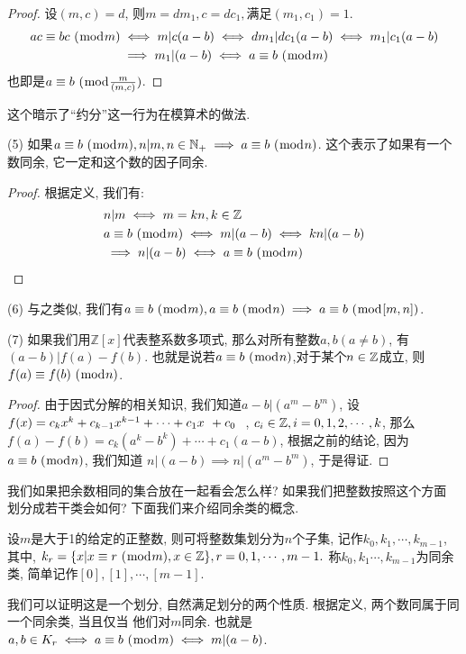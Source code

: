\begin{proof}
    设$(m,c)=d$, 则$m=dm_1, c=dc_1, $满足$(m_1, c_1)=1.$
    \begin{align*}
        {ac} \equiv {bc} ~(\bmod {m}) &\iff m|c(a-b) \iff dm_1 | dc_1(a-b) \iff m_1|c_1(a-b) \\
        &\implies m_1|(a-b) \iff {a} \equiv {b} ~(\bmod {m})
    \end{align*}
    也即是${a} \equiv {b} ~(\bmod {m\over (m,c)}) $.
\end{proof}

这个暗示了``约分''这一行为在模算术的做法. 

(5) 如果${a} \equiv {b} ~(\bmod {m}), n|m, n\in \mathbb N_+\implies {a} \equiv {b} ~(\bmod {n})$. 这个表示了如果有一个数同余, 
它一定和这个数的因子同余. 

\begin{proof}根据定义, 我们有: 
    \begin{align*}
        &n|m \iff m=kn, k\in \mathbb Z \\
        & {a} \equiv {b} ~(\bmod {m}) \iff m|(a-b) \iff kn|(a-b)\\
        &\implies n|(a-b) \iff {a} \equiv {b} ~(\bmod {m})
    \end{align*}
\end{proof}

(6) 与之类似, 我们有${a} \equiv {b} ~(\bmod {m}), {a} \equiv {b} ~(\bmod {n}) \implies {a} \equiv {b} ~(\bmod {[m,n]})$. 

(7) 如果我们用$\mathbb Z[x]$代表整系数多项式, 那么对所有整数$a,b(a\neq b)$, 有
$(a-b)|f(a)-f(b)$. 也就是说若${a} \equiv {b} ~(\bmod {n})$,对于某个$n\in {\mathbb Z}$成立, 则${f(a)} \equiv {f(b)} ~(\bmod {n})$. 

\begin{proof}
    由于因式分解的相关知识, 我们知道$a-b|(a^m-b^m)$, 设$f(x)=c_{k}{x^{k}}+c_{k-1}{x^{k-1}}
    +\cdots+c_{1}{x^{~}}+c_{0}{~^{~}}$, $c_i\in {\mathbb Z}, i=0,1,2,\cdots, k$, 那么$f(a)-f(b)=
    c_k(a^k-b^k)+\cdots+c_1(a-b)$, 根据之前的结论, 因为${a} \equiv {b} ~(\bmod {n})$, 我们知道
    $n|(a-b)\implies n|(a^m-b^m)$, 于是得证. 
\end{proof}

 我们如果把余数相同的集合放在一起看会怎么样? 如果我们把整数按照这个方面
划分成若干类会如何? 下面我们来介绍同余类的概念. 

\begin{definition}[同余类]
    设$m$是大于1的给定的正整数, 则可将整数集划分为$n$个子集, 记作$k_0, k_1, \cdots, k_
    {m-1}$, 其中, $k_r=\{x|{x} \equiv {r} ~(\bmod {m}), x\in {\mathbb Z}\}, r=0,1,\cdots, m-1.$ 称$k_0, k_1
    \cdots, k_{m-1}$为同余类, 简单记作$[0], [1], \cdots, [m-1]$. 
\end{definition}

我们可以证明这是一个划分, 自然满足划分的两个性质. 根据定义, 两个数同属于同一个同余类, 当且仅当
他们对$m$同余. 也就是$a,b\in K_r \iff {a} \equiv {b} ~(\bmod {m}) \iff m|(a-b)$. 

